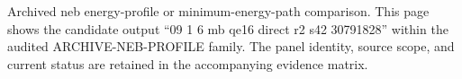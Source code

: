 Archived neb energy-profile or minimum-energy-path comparison. This page shows the candidate output ``09 1 6 mb qe16 direct r2 s42 30791828'' within the audited ARCHIVE-NEB-PROFILE family. The panel identity, source scope, and current status are retained in the accompanying evidence matrix.
